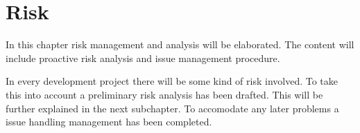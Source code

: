 \chapter{Risk}
In this chapter risk management and analysis will be elaborated. The content will include proactive risk analysis and issue management procedure. 

In every development project there will be some kind of risk involved. To take this into account a preliminary risk analysis has been drafted. This will be further explained in the next subchapter. To accomodate any later problems a issue handling management has been completed. 


